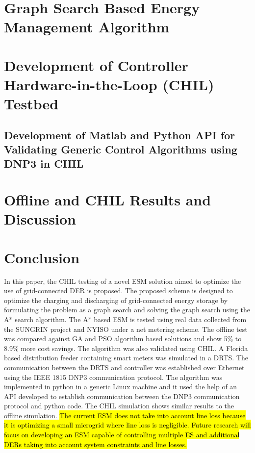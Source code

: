 \documentclass[journal]{IEEEtran}
\begin{document}
\section{Graph Search Based Energy Management Algorithm}


\section{Development of Controller Hardware-in-the-Loop (CHIL) Testbed} \label{SEC:TB}


\subsection{Development of Matlab and Python API for Validating Generic Control Algorithms using DNP3 in CHIL}\label{SEC:API_DNM3}


\section{Offline and CHIL Results and Discussion}





\section{Conclusion}
In this paper, the CHIL testing of a novel ESM solution aimed to optimize the use of grid-connected DER is proposed. The proposed scheme is designed to optimize the charging and discharging of grid-connected energy storage by formulating the problem as a graph search and solving the graph search using the A* search algorithm. The A* based ESM is tested using real data collected from the SUNGRIN project and NYISO under a net metering scheme. The offline test was compared against GA and PSO algorithm based solutions and show 5\% to 8.9\% more cost savings. The algorithm was also validated using CHIL. A Florida based distribution feeder containing smart meters was simulated in a DRTS. The communication between the DRTS and controller was established over Ethernet using the IEEE 1815 DNP3 communication protocol. The algorithm was implemented in python in a generic Linux machine and it used the help of an API developed to establish communication between the DNP3 communication protocol and python code. The CHIL simulation shows similar results to the offline simulation. \hl{The current ESM does not take into account line loss because it is optimizing a small microgrid where line loss is negligible. Future research will focus on developing an ESM capable of controlling multiple ES and additional DERs taking into account system constraints and line losses.}
\end{document}
